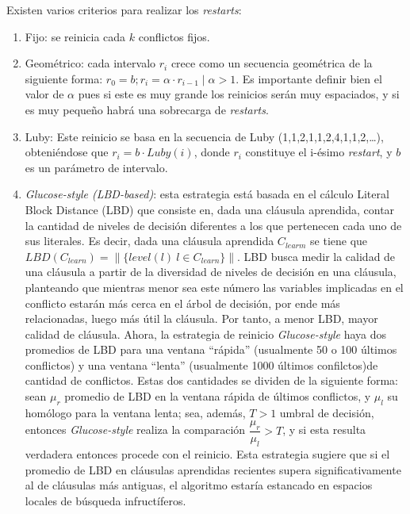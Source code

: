 Existen varios criterios para realizar los \textit{restarts}:
\begin{enumerate}
\item Fijo: se reinicia cada $k$ conflictos fijos.
\item Geométrico: cada intervalo $r_i$ crece como un secuencia geométrica de la siguiente forma: $r_0 = b; r_i = \alpha \cdot r_{i-1} \mid \alpha > 1$. Es importante definir bien el valor de $\alpha$ pues si este es muy grande los reinicios serán muy espaciados, y si es muy pequeño habrá una sobrecarga de \textit{restarts}.
\item Luby: Este reinicio se basa en la secuencia de Luby (1,1,2,1,1,2,4,1,1,2,…), obteniéndose que $r_i = b \cdot Luby(i)$, donde $r_i$ constituye el i-ésimo \textit{restart}, y $b$ es un parámetro de intervalo.
\item \textit{Glucose-style (LBD-based)}: esta estrategia está basada en el cálculo Literal Block Distance (LBD) que consiste en, dada una cláusula aprendida, contar la cantidad de niveles de decisión diferentes a los que pertenecen cada uno de sus literales. Es decir, dada una cláusula aprendida $C_{learm}$ se tiene que $LBD(C_{learn}) = \|\{level(l)\: l \in C_{learn} \}\|$. LBD busca medir la calidad de una cláusula a partir de la diversidad de niveles de decisión en una cláusula, planteando que mientras menor sea este número las variables implicadas en el conflicto estarán más cerca en el árbol de decisión, por ende más relacionadas, luego más útil la cláusula. Por tanto, a menor LBD, mayor calidad de cláusula. Ahora, la estrategia de reinicio \textit{Glucose-style} haya dos promedios de LBD para una ventana ``rápida'' (usualmente 50 o 100 últimos conflictos) y una ventana ``lenta'' (usualmente 1000 últimos confilctos)de cantidad de conflictos. Estas dos cantidades se dividen de la siguiente forma: sean $\mu_r$ promedio de LBD en la ventana rápida de últimos conflictos, y $\mu_l$ su homólogo para la ventana lenta; sea, además, $T > 1$ umbral de decisión, entonces \textit{Glucose-style} realiza la comparación $\dfrac{\mu_r}{\mu_l} > T$, y si esta resulta verdadera entonces procede con el reinicio. Esta estrategia sugiere que si el promedio de LBD en cláusulas aprendidas recientes supera significativamente al de cláusulas más antiguas, el algoritmo estaría estancado en espacios locales de búsqueda infructíferos.
\end{enumerate}



